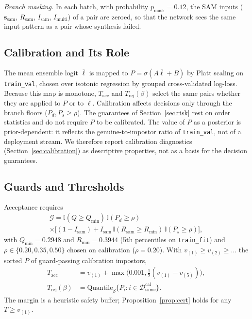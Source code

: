 \documentclass[journal]{IEEEtran}
\newcommand{\vect}[1]{\mathbf{#1}}
\begin{document}
\emph{Branch masking.} In each batch, with probability $p_{\text{mask}}=0.12$, the SAM inputs ($\vect{s}_{\text{sam}}$, $R_{\text{sam}}$, $I_{\text{sam}}$, $I_{\text{multi}}$) of a pair are zeroed, so that the network sees the same input pattern as a pair whose synthesis failed.

\subsection{Calibration and Its Role}
\label{sec:calib_role}
The mean ensemble logit $\bar\ell$ is mapped to $P=\sigma(A\bar\ell+B)$ by Platt scaling on \texttt{train\_val}, chosen over isotonic regression by grouped cross-validated log-loss. Because this map is monotone, $T_{\text{acc}}$ and $T_{\text{rej}}(\beta)$ select the same pairs whether they are applied to $P$ or to $\bar\ell$. Calibration affects decisions only through the branch floors ($P_d,P_s\ge\rho$). The guarantees of Section~\ref{sec:risk} rest on order statistics and do not require $P$ to be calibrated. The value of $P$ as a posterior is prior-dependent: it reflects the genuine-to-impostor ratio of \texttt{train\_val}, not of a deployment stream. We therefore report calibration diagnostics (Section~\ref{sec:calibration}) as descriptive properties, not as a basis for the decision guarantees.

\subsection{Guards and Thresholds}
Acceptance requires
\begin{multline}
\mathcal{G}=\mathbb{I}(Q\ge Q_{\min})\,\mathbb{I}(P_d\ge\rho)\\
\times\big[(1-I_{\text{sam}})+I_{\text{sam}}\,\mathbb{I}(R_{\text{sam}}\ge R_{\min})\,\mathbb{I}(P_s\ge\rho)\big],
\end{multline}
with $Q_{\min}=0.2948$ and $R_{\min}=0.3944$ (5th percentiles on \texttt{train\_fit}) and $\rho\in\{0.20,0.35,0.50\}$ chosen on calibration ($\rho=0.20$). With $v_{(1)}\ge v_{(2)}\ge\dots$ the sorted $P$ of guard-passing calibration impostors,
\begin{align}
T_{\text{acc}}&=v_{(1)}+\max\!\big(0.001,\tfrac12(v_{(1)}-v_{(5)})\big),\\
T_{\text{rej}}(\beta)&=\text{Quantile}_{\beta}\{P_i: i\in\mathcal{D}^{\text{cal}}_{\text{same}}\}.
\end{align}
The margin is a heuristic safety buffer; Proposition~\ref{prop:cert} holds for any $T\ge v_{(1)}$.
\end{document}
